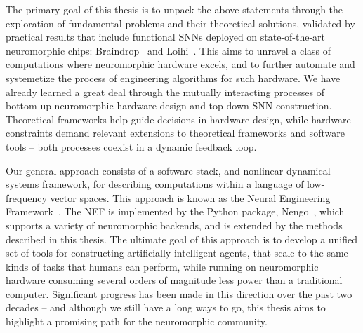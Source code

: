 The primary goal of this thesis is to unpack the above statements through the exploration of fundamental problems and their theoretical solutions, validated by practical results that include functional SNNs deployed on state-of-the-art neuromorphic chips: Braindrop~\citep{braindrop2019} and Loihi~\citep{davies2018loihi}.
This aims to unravel a class of computations where neuromorphic hardware excels, and to further automate and systemetize the process of engineering algorithms for such hardware.
We have already learned a great deal through the mutually interacting processes of bottom-up neuromorphic hardware design and top-down SNN construction.
Theoretical frameworks help guide decisions in hardware design, while hardware constraints demand relevant extensions to theoretical frameworks and software tools -- both processes coexist in a dynamic feedback loop.

Our general approach consists of a software stack, and nonlinear dynamical systems framework,
for describing computations within a language of low-frequency vector spaces.
This approach is known as the Neural Engineering Framework~\citep[NEF;][]{eliasmith2003a}.
The NEF is implemented by the Python package, Nengo~\citep{bekolay2014}, which supports a variety of neuromorphic backends, and is extended by the methods
described in this thesis.
The ultimate goal of this approach is to develop a unified set of tools for constructing
artificially intelligent agents, that scale to the same kinds of tasks that
humans can perform, while running on neuromorphic hardware consuming several orders of magnitude less power than a traditional computer.
Significant progress has been made in this direction over the past two decades -- and although we still
have a long ways to go, this thesis aims to highlight a promising path for the neuromorphic community.

